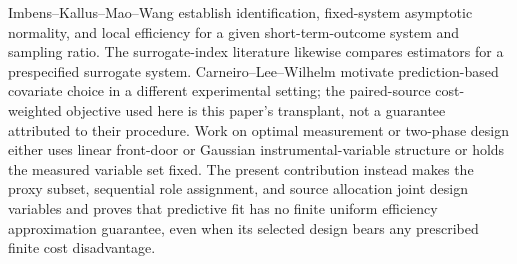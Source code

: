 Imbens--Kallus--Mao--Wang establish identification, fixed-system asymptotic normality, and local efficiency for a given short-term-outcome system and sampling ratio. The surrogate-index literature likewise compares estimators for a prespecified surrogate system. Carneiro--Lee--Wilhelm motivate prediction-based covariate choice in a different experimental setting; the paired-source cost-weighted objective used here is this paper's transplant, not a guarantee attributed to their procedure. Work on optimal measurement or two-phase design either uses linear front-door or Gaussian instrumental-variable structure or holds the measured variable set fixed. The present contribution instead makes the proxy subset, sequential role assignment, and source allocation joint design variables and proves that predictive fit has no finite uniform efficiency approximation guarantee, even when its selected design bears any prescribed finite cost disadvantage.